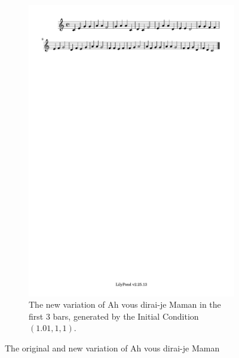 \documentclass[11pt]{article}
\theoremstyle{definition}
\begin{document}
\begin{figure}
\begin{subfigure}{\textwidth}
  \includegraphics[trim=1cm 26.5cm 10.1cm 0.02cm, clip, scale=1]{dabby_2.pdf}
  \caption{The new variation of Ah vous dirai-je Maman in the first 3 bars, generated by the Initial Condition $(1.01, 1, 1)$.}
  \label{fig:Dabby2}
\end{subfigure}
\caption{The original and new variation of Ah vous dirai-je Maman}
\end{figure}
\end{document}
